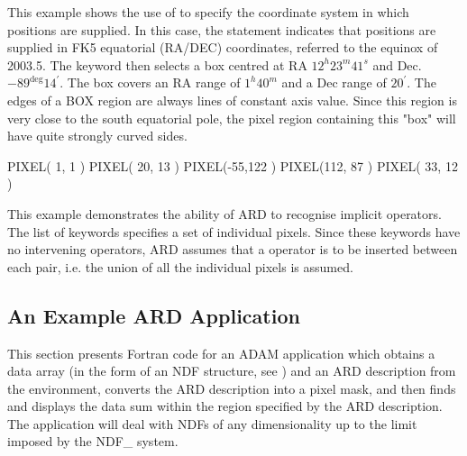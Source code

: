 \documentclass[11pt]{starlink}
\begin{document}
This example shows the use of  to specify the
coordinate system in which positions are supplied. In this case, the
 statement indicates that positions are
supplied in FK5 equatorial (RA/DEC) coordinates, referred to the equinox
of 2003.5. The  keyword then selects a box centred
at RA $12^{h}23^{m}41^{s}$ and Dec. $-89^{\deg}14^{'}$. The box covers an
RA range of $1^{h}40^{m}$ and a Dec range of $20^{'}$. The edges of a BOX
region are always lines of constant axis value. Since this region is very
close to the south equatorial pole, the pixel region containing this
"box" will have quite strongly curved sides.

\small
\begin{terminalv}
      PIXEL(  1,  1 )
      PIXEL( 20, 13 )
      PIXEL(-55,122 )
      PIXEL(112, 87 )
      PIXEL( 33, 12 )
\end{terminalv}
\normalsize

This example demonstrates the ability of ARD to recognise implicit
 operators. The list of 
keywords specifies a set of individual pixels. Since these keywords have
no intervening operators, ARD assumes that a 
operator is to be inserted between each pair, i.e. the union of all the
individual pixels is assumed.

\subsection{\label{SEC:EXAMC}An Example ARD Application}

This section presents Fortran code for an ADAM application which obtains
a data array (in the form of an NDF structure, see )
and an ARD description from the environment, converts the ARD description
into a pixel mask, and then finds and displays the data sum within the
region specified by the ARD description. The application will deal with
NDFs of any dimensionality up to the limit imposed by the NDF\_ system.
\end{document}

